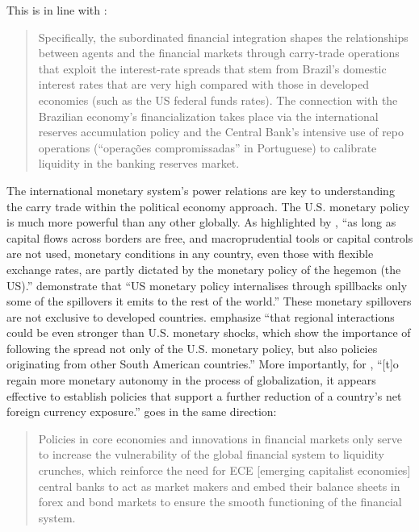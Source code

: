 \documentclass[a4paper, twoside]{templates/ociamthesis}
\begin{document}
This is in line with \textcite[ 11]{bresser-pereira2020}:

\begin{quote}
Specifically, the subordinated financial integration shapes the relationships between agents and the financial markets through carry-trade operations that exploit the interest-rate spreads that stem from Brazil's domestic interest rates that are very high compared with those in developed economies (such as the US federal funds rates). The connection with the Brazilian economy's financialization takes place via the international reserves accumulation policy and the Central Bank's intensive use of repo operations (``operações compromissadas'' in Portuguese) to calibrate liquidity in the banking reserves market.
\end{quote}

The international monetary system's power relations are key to understanding the carry trade within the political economy approach. The U.S. monetary policy is much more powerful than any other globally. As highlighted by \textcite[ 45]{miranda-agrippino2021}, ``as long as capital flows across borders are free, and macroprudential tools or capital controls are not used, monetary conditions in any country, even those with flexible exchange rates, are partly dictated by the monetary policy of the hegemon (the US).'' \textcite[ 27]{breitenlechner2021} demonstrate that ``US monetary policy internalises through spillbacks only some of the spillovers it emits to the rest of the world.'' These monetary spillovers are not exclusive to developed countries. \textcite[ 753]{cavaca2021} emphasize ``that regional interactions could be even stronger than U.S. monetary shocks, which show the importance of following the spread not only of the U.S. monetary policy, but also policies originating from other South American countries.'' More importantly, for \textcite[ 14]{bernoth2021}, ``{[}t{]}o regain more monetary autonomy in the process of globalization, it appears effective to establish policies that support a further reduction of a country's net foreign currency exposure.'' \textcite[ 15]{musthaq2021} goes in the same direction:

\begin{quote}
Policies in core economies and innovations in financial markets only serve to increase the vulnerability of the global financial system to liquidity crunches, which reinforce the need for ECE {[}emerging capitalist economies{]} central banks to act as market makers and embed their balance sheets in forex and bond markets to ensure the smooth functioning of the financial system.
\end{quote}
\end{document}
